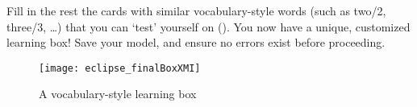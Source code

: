 \begin{stepbystep}
\item Fill in the rest the cards with similar vocabulary-style words (such as two/2, three/3, \ldots) that you can `test' yourself on
(). You now have a unique, customized learning box! Save your model, and ensure no errors exist before proceeding.

\begin{figure}[htbp]
	\centering
  \texttt{[image: eclipse\_finalBoxXMI]}
	\caption{A vocabulary-style learning box}
	\label{eclipse:finalXMI}
\end{figure}

\end{stepbystep}
